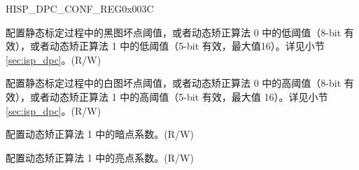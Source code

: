 \begin{register}{H}{ISP\_DPC\_CONF\_REG}{0x003C}\label{regdesc:ISPDPCCONFREG}
%
%
%
%
%
\regnewline%
\begin{regdesc}\begin{reglist}
\label{fielddesc:ISPDPCTHRESHOLDL}\item [ISP\_DPC\_THRESHOLD\_L] 配置静态标定过程中的黑图坏点阈值，或者动态矫正算法 0 中的低阈值（8-bit 有效），或者动态矫正算法 1 中的低阈值（5-bit 有效，最大值16）。详见小节 \ref{sec:isp_dpc}。(R/W)
\label{fielddesc:ISPDPCTHRESHOLDH}\item [ISP\_DPC\_THRESHOLD\_H] 配置静态标定过程中的白图坏点阈值，或者动态矫正算法 0 中的高阈值（8-bit 有效），或者动态矫正算法 1 中的高阈值（5-bit 有效，最大值 16）。详见小节 \ref{sec:isp_dpc}。(R/W)
\label{fielddesc:ISPDPCFACTORDARK}\item [ISP\_DPC\_FACTOR\_DARK] 配置动态矫正算法 1 中的暗点系数。(R/W)
\label{fielddesc:ISPDPCFACTORBRIG}\item [ISP\_DPC\_FACTOR\_BRIG] 配置动态矫正算法 1 中的亮点系数。(R/W)
\end{reglist}\end{regdesc}
\end{register}


